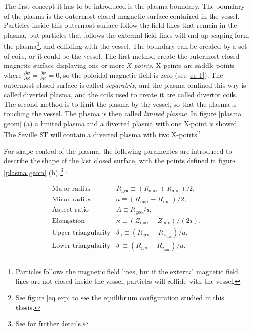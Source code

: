 \documentclass[a4paper,12pt,oneside]{book}
\newcommand{\p}{\partial}
\begin{document}
The first concept it has to be introduced is the plasma boundary. The boundary of the plasma is the outermost closed magnetic surface contained in the vessel. Particles inside this outermost surface follow the field lines that remain in the plasma, but particles that follows the external field lines will end up scaping form the plasma\footnote{Particles follows the magnetic field lines, but if the external magnetic field lines are not closed inside the vessel, particles will collide with the vessel.}, and colliding with the vessel. The boundary can be created by a set of coils, or it could be the vessel. The first method create the outermost closed magnetic surface displaying one or more \textit{X-points}. X-points are saddle points where $\frac{\p \psi}{\p Z}=\frac{\p \psi}{\p R}=0$, so the poloidal magnetic field is zero (see \eqref{ec 1}). The outermost closed surface is called \textit{separatrix}, and the plasma confined this way is called diverted plasma, and the coils used to create it are called divertor coils. The second method is to limit the plasma by the vessel, so that the plasma is touching the vessel. The plasma is then called \textit{limited plasma}. In figure \ref{plasma geom} (a) a limited plasma and a diverted plasma with one X-point is showed. The Seville ST will contain a diverted plasma with two X-points\footnote{See figure \ref{eq exp} to see the equilibrium configuration studied in this thesis.}

For shape control of the plasma, the following paramentes are introduced to describe the shape of the last closed surface, with the points defined in figure \ref{plasma geom} (b) \footnote{See \cite{shape} for further details.} :

\begin{equation}\label{ec shape}
\begin{array}{cc}
\text{Major radius} & R_\text{geo} \equiv (R_\text{max}+R_\text{min})/2, 
\\
\text{Minor radius} & a \equiv (R_\text{max}-R_\text{min})/2,
\\
\text{Aspect ratio} & A \equiv R_\text{geo}/a,
\\
\text{Elongation} & \kappa \equiv (Z_\text{max}-Z_\text{min})/(2a),
\\
\text{Upper triangularity} & \delta_\text{u} \equiv (R_\text{geo}-R_{\text{z}_\text{max}})/a,
\\
\text{Lower triangularity} & \delta_\text{l} \equiv (R_\text{geo}-R_{\text{z}_\text{min}})/a.
\end{array}
\end{equation}
\end{document}
